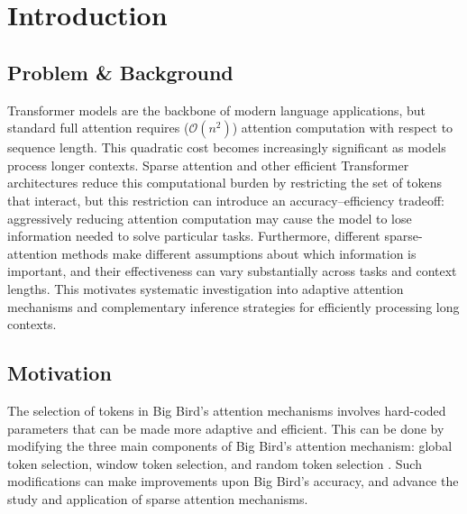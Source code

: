 \documentclass{article}
\begin{document}
\section{Introduction} %

\subsection{Problem \& Background} %

Transformer models are the backbone of modern language applications, but standard full attention requires ($\mathcal{O}(n^2)$) attention computation with respect to sequence length. This quadratic cost becomes increasingly significant as models process longer contexts. Sparse attention and other efficient Transformer architectures reduce this computational burden by restricting the set of tokens that interact, but this restriction can introduce an accuracy–efficiency tradeoff: aggressively reducing attention computation may cause the model to lose information needed to solve particular tasks. Furthermore, different sparse-attention methods make different assumptions about which information is important, and their effectiveness can vary substantially across tasks and context lengths. This motivates systematic investigation into adaptive attention mechanisms and complementary inference strategies for efficiently processing long contexts.

\subsection{Motivation}

The selection of tokens in Big Bird's attention mechanisms involves hard-coded parameters that can be made more adaptive and efficient. This can be done by modifying the three main components of Big Bird's attention mechanism: global token selection, window token selection, and random token selection \cite{bigbird}. Such modifications can make improvements upon Big Bird's accuracy, and advance the study and application of sparse attention mechanisms.
\end{document}
